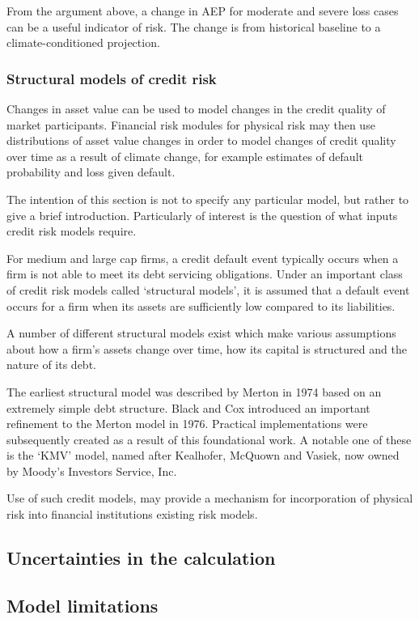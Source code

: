 \documentclass[a4paper,11pt]{extarticle} %
\theoremstyle{definition}
\begin{document}
From the argument above, a change in AEP for moderate and severe loss cases can be a useful indicator of risk. The change is from historical baseline to a climate-conditioned projection.

\subsubsection{Structural models of credit risk}
Changes in asset value can be used to model changes in the credit quality of market participants. Financial risk modules for physical risk may then use distributions of asset value changes in order to model changes of credit quality over time as a result of climate change, for example estimates of default probability and loss given default.

The intention of this section is not to specify any particular model, but rather to give a brief introduction. Particularly of interest is the question of what inputs credit risk models require.

For medium and large cap firms, a credit default event typically occurs when a firm is not able to meet its debt servicing obligations. Under an important class of credit risk models called `structural models', it is assumed that a default event occurs for a firm when its assets are sufficiently low compared to its liabilities.

A number of different structural models exist which make various assumptions about how a firm's assets change over time, how its capital is structured and the nature of its debt.

The earliest structural model was described by Merton in 1974 \cite{Merton:1974} based on an extremely simple debt structure. Black and Cox \cite{BlackCox:1976} introduced an important refinement to the Merton model in 1976. Practical implementations were subsequently created as a result of this foundational work. A notable one of these is the `KMV' model, named after Kealhofer, McQuown and Vasiek, now owned by Moody's Investors Service, Inc.

Use of such credit models, may provide a mechanism for incorporation of physical risk into financial institutions existing risk models\cite{KenyonEtAl:2021}.

\subsection{Uncertainties in the calculation}

\subsection{Model limitations}
\end{document}
